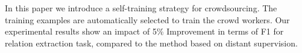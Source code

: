 In this paper we introduce a self-training strategy for crowdsourcing. The training examples are automatically selected to train the crowd workers. Our experimental results show an impact of 5\% Improvement in terms of F1 for relation extraction task, compared to the method based on distant supervision.
